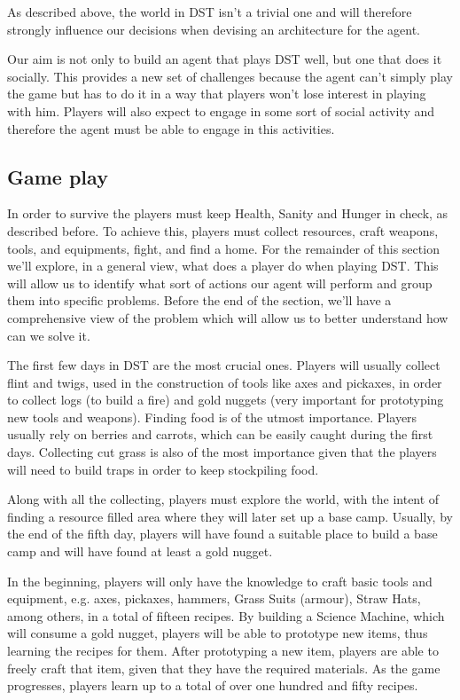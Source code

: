 As described above, the world in \ac{DST} isn't a trivial one and will therefore strongly influence our decisions when devising an architecture for the agent.

Our aim is not only to build an agent that plays \ac{DST} well, but one that does it socially.
This provides a new set of challenges because the agent can't simply play the game but has to do it in a way that players won't lose interest in playing with him.
Players will also expect to engage in some sort of social activity and therefore the agent must be able to engage in this activities.

\subsection{Game play}
In order to survive the players must keep Health, Sanity and Hunger in check, as described before.
To achieve this, players must collect resources, craft weapons, tools, and equipments, fight, and find a home.
For the remainder of this section we'll explore, in a general view, what does a player do when playing \ac{DST}.
This will allow us to identify what sort of actions our agent will perform and group them into specific problems.
Before the end of the section, we'll have a comprehensive view of the problem which will allow us to better understand how can we solve it.

The first few days in \ac{DST} are the most crucial ones.
Players will usually collect flint and twigs, used in the construction of tools like axes and pickaxes, in order to collect logs (to build a fire) and gold nuggets (very important for prototyping new tools and weapons).
Finding food is of the utmost importance. 
Players usually rely on berries and carrots, which can be easily caught during the first days.
Collecting cut grass is also of the most importance given that the players will need to build traps in order to keep stockpiling food.

Along with all the collecting, players must explore the world, with the intent of finding a resource filled area where they will later set up a base camp.
Usually, by the end of the fifth day, players will have found a suitable place to build a base camp and will have found at least a gold nugget.

In the beginning, players will only have the knowledge to craft basic tools and equipment, e.g. axes, pickaxes, hammers, Grass Suits (armour), Straw Hats, among others, in a total of fifteen recipes.
By building a Science Machine, which will consume a gold nugget, players will be able to prototype new items, thus learning the recipes for them.
After prototyping a new item, players are able to freely craft that item, given that they have the required materials.
As the game progresses, players learn up to a total of over one hundred and fifty recipes.

